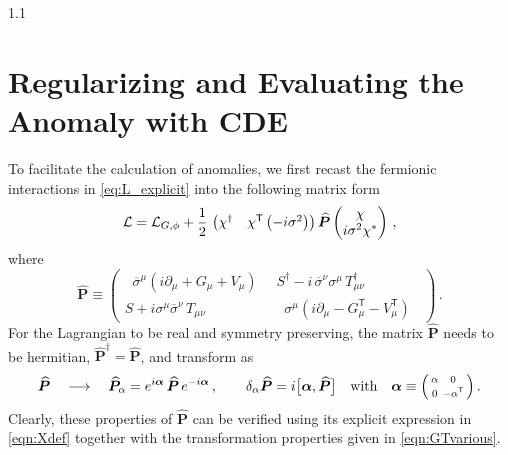 \documentclass[a4paper,12pt]{article}
\def\L{{\cal L}}
\def\mat#1{\boldsymbol{#1}}
\def\T{\textsf{T}}
\def\X{\mat{\widehat{P}}}
\def\alphamat{\mat{\alpha}}
\begin{document}
\begin{spacing}{1.1}
\section{Regularizing and Evaluating the Anomaly with CDE}
\label{sec:CDE}

To facilitate the calculation of anomalies, we first recast the fermionic interactions in \cref{eq:L_explicit} into the following matrix form
\begin{equation}
\L = \L_{G, \phi} + \frac12 \, \begin{pmatrix} \chi^\dagger & \chi^\T \left(-i\sigma^2\right) \end{pmatrix} \X
\begin{pmatrix} \chi \\ i\sigma^2 \chi^* \end{pmatrix} \,,
\label{eq:L_matrix}
\end{equation}
where
\begin{equation}
\X
\equiv \begin{pmatrix}
\;\; \overline\sigma^\mu (i\partial_\mu +G_\mu + V_\mu) \;\;& S^\dagger -i\,\overline{\sigma}^\nu \sigma^\mu\, T^\dagger_{\mu\nu} \\[3pt]
S +i \sigma^\mu \overline{\sigma}^\nu\, T_{\mu\nu} &\;\; \sigma^\mu (i\partial_\mu -G^\T_\mu -V^\T_\mu) \;\;
\end{pmatrix} \,.
\label{eqn:Xdef}
\end{equation}
For the Lagrangian to be real and symmetry preserving, the matrix $\X$ needs to be hermitian, $\X^\dagger = \X$, and transform as
\begin{equation}
\X
\quad\longrightarrow\quad
\X_\alpha = e^{i\alphamat}\, \X \, e^{-i\alphamat} \,,\qquad
\delta_\alpha \X = i \bigl[ \alphamat, \X \bigr] 
\quad\text{with}\quad
\alphamat \equiv \Bigl(\begin{smallmatrix} \alpha & 0 \\[2pt] 0 & -\alpha^\T \end{smallmatrix}\Bigr) \,.
\label{eqn:GTX}
\end{equation}
Clearly, these properties of $\X$ can be verified using its explicit expression in \cref{eqn:Xdef} together with the transformation properties given in \cref{eqn:GTvarious}.


\end{spacing}
\end{document}
